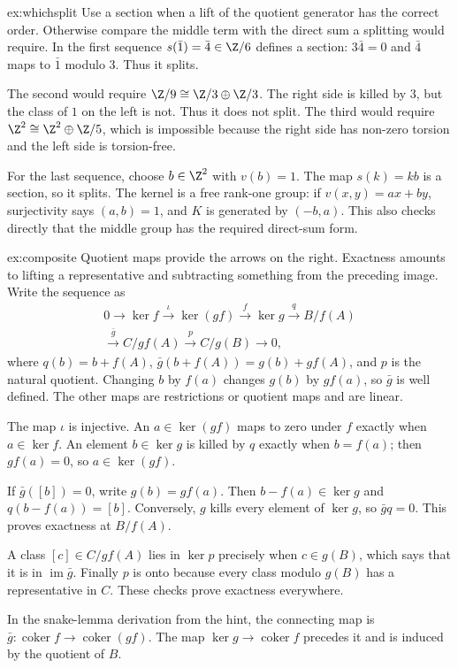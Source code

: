 \begin{solution}{ex:whichsplit}
\idea Use a section when a lift of the quotient generator has the correct order. Otherwise compare the middle term with the direct sum a splitting would require.
\writeup In the first sequence $s(\bar1)=\bar4\in\Z/6$ defines a section: $3\bar4=0$ and $\bar4$ maps to $\bar1$ modulo $3$. Thus it splits.

The second would require $\Z/9\cong\Z/3\oplus\Z/3$. The right side is killed by $3$, but the class of $1$ on the left is not. Thus it does not split. The third would require $\Z^2\cong\Z^2\oplus\Z/5$, which is impossible because the right side has non-zero torsion and the left side is torsion-free.

For the last sequence, choose $b\in\Z^2$ with $v(b)=1$. The map $s(k)=kb$ is a section, so it splits. The kernel is a free rank-one group: if $v(x,y)=ax+by$, surjectivity says $(a,b)=1$, and $K$ is generated by $(-b,a)$. This also checks directly that the middle group has the required direct-sum form.
\end{solution}

\begin{solution}{ex:composite}
\idea Quotient maps provide the arrows on the right. Exactness amounts to lifting a representative and subtracting something from the preceding image.
\writeup Write the sequence as
\[
\begin{gathered}
0\to\ker f\xrightarrow{\iota}\ker(gf)\xrightarrow f\ker g
\xrightarrow{q}B/f(A)\\
\xrightarrow{\bar g}C/gf(A)\xrightarrow{p}C/g(B)\to0,
\end{gathered}
\]
where $q(b)=b+f(A)$, $\bar g(b+f(A))=g(b)+gf(A)$, and $p$ is the natural quotient. Changing $b$ by $f(a)$ changes $g(b)$ by $gf(a)$, so $\bar g$ is well defined. The other maps are restrictions or quotient maps and are linear.

The map $\iota$ is injective. An $a\in\ker(gf)$ maps to zero under $f$ exactly when $a\in\ker f$. An element $b\in\ker g$ is killed by $q$ exactly when $b=f(a)$; then $gf(a)=0$, so $a\in\ker(gf)$.

If $\bar g([b])=0$, write $g(b)=gf(a)$. Then $b-f(a)\in\ker g$ and $q(b-f(a))=[b]$. Conversely, $g$ kills every element of $\ker g$, so $\bar gq=0$. This proves exactness at $B/f(A)$.

A class $[c]\in C/gf(A)$ lies in $\ker p$ precisely when $c\in g(B)$, which says that it is in $\operatorname{im}\bar g$. Finally $p$ is onto because every class modulo $g(B)$ has a representative in $C$. These checks prove exactness everywhere.

In the snake-lemma derivation from the hint, the connecting map is $\bar g\colon\operatorname{coker}f\to\operatorname{coker}(gf)$. The map $\ker g\to\operatorname{coker}f$ precedes it and is induced by the quotient of $B$.
\end{solution}

